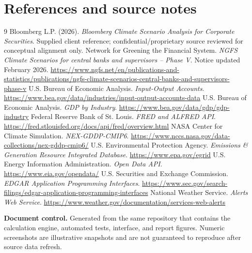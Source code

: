 \documentclass[10pt]{article}
\begin{document}
\section{References and source notes}

\begin{thebibliography}{9}
 Bloomberg L.P. (2026). \emph{Bloomberg Climate Scenario Analysis for Corporate Securities}. Supplied client reference; confidential/proprietary source reviewed for conceptual alignment only.
 Network for Greening the Financial System. \emph{NGFS Climate Scenarios for central banks and supervisors -- Phase V}. Notice updated February 2026. \url{https://www.ngfs.net/en/publications-and-statistics/publications/ngfs-climate-scenarios-central-banks-and-supervisors-phase-v}
 U.S. Bureau of Economic Analysis. \emph{Input-Output Accounts}. \url{https://www.bea.gov/data/industries/input-output-accounts-data}
 U.S. Bureau of Economic Analysis. \emph{GDP by Industry}. \url{https://www.bea.gov/data/gdp/gdp-industry}
 Federal Reserve Bank of St. Louis. \emph{FRED and ALFRED API}. \url{https://fred.stlouisfed.org/docs/api/fred/overview.html}
 NASA Center for Climate Simulation. \emph{NEX-GDDP-CMIP6}. \url{https://www.nccs.nasa.gov/data-collections/nex-gddp-cmip6/}
 U.S. Environmental Protection Agency. \emph{Emissions \& Generation Resource Integrated Database}. \url{https://www.epa.gov/egrid}
 U.S. Energy Information Administration. \emph{Open Data API}. \url{https://www.eia.gov/opendata/}
 U.S. Securities and Exchange Commission. \emph{EDGAR Application Programming Interfaces}. \url{https://www.sec.gov/search-filings/edgar-application-programming-interfaces}
 National Weather Service. \emph{Alerts Web Service}. \url{https://www.weather.gov/documentation/services-web-alerts}
\end{thebibliography}

\vfill
{\small\color{muted}\textbf{Document control.} Generated from the same repository that contains the calculation engine, automated tests, interface, and report figures. Numeric screenshots are illustrative snapshots and are not guaranteed to reproduce after source data refresh.}
\end{document}
